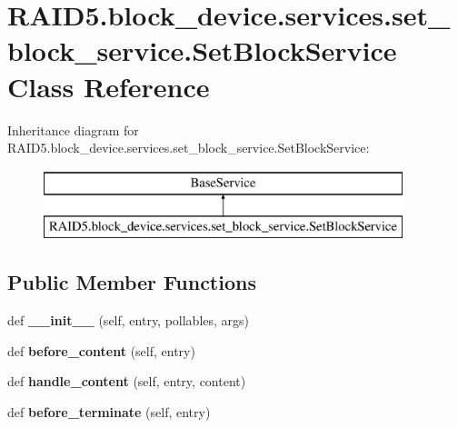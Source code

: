 \hypertarget{class_r_a_i_d5_1_1block__device_1_1services_1_1set__block__service_1_1_set_block_service}{}\section{R\+A\+I\+D5.\+block\+\_\+device.\+services.\+set\+\_\+block\+\_\+service.\+Set\+Block\+Service Class Reference}
\label{class_r_a_i_d5_1_1block__device_1_1services_1_1set__block__service_1_1_set_block_service}
Inheritance diagram for R\+A\+I\+D5.\+block\+\_\+device.\+services.\+set\+\_\+block\+\_\+service.\+Set\+Block\+Service\+:\begin{figure}[H]
\begin{center}
\leavevmode
\includegraphics[height=2.000000cm]{class_r_a_i_d5_1_1block__device_1_1services_1_1set__block__service_1_1_set_block_service}
\end{center}
\end{figure}
\subsection*{Public Member Functions}
\begin{DoxyCompactItemize}
\item 
\mbox{\label{class_r_a_i_d5_1_1block__device_1_1services_1_1set__block__service_1_1_set_block_service_a591d47df0e924696ac23450906f5ddf2}} 
def {\bfseries \+\_\+\+\_\+init\+\_\+\+\_\+} (self, entry, pollables, args)
\item 
\mbox{\label{class_r_a_i_d5_1_1block__device_1_1services_1_1set__block__service_1_1_set_block_service_a00766fb59a3f4118444ab9265cb9e9d2}} 
def {\bfseries before\+\_\+content} (self, entry)
\item 
\mbox{\label{class_r_a_i_d5_1_1block__device_1_1services_1_1set__block__service_1_1_set_block_service_ac79d1b55a4e34943fa1e4f9514d9891d}} 
def {\bfseries handle\+\_\+content} (self, entry, content)
\item 
\mbox{\label{class_r_a_i_d5_1_1block__device_1_1services_1_1set__block__service_1_1_set_block_service_af727ae5baf474b50749faaff9f6f7811}} 
def {\bfseries before\+\_\+terminate} (self, entry)
\end{DoxyCompactItemize}

